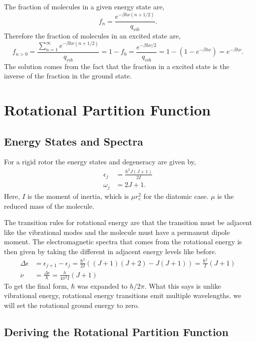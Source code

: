The fraction of molecules in a given energy state are,
\begin{equation*}
	f_n = \frac{e^{-\beta h\nu (n+1/2)}}{q_{vib}}.
\end{equation*}
Therefore the fraction of molecules in an excited state are,
\begin{equation*}
	f_{n > 0} = \frac{\sum_{n=1}^{\infty}{e^{-\beta h\nu (n+1/2)}}}{q_{vib}} = 1
	- f_0 = \frac{e^{-\beta h\nu /2}}{q_{vib}} = 1 - (1 - e^{-\beta h \nu}) =
	e^{-\beta h \nu}.
\end{equation*}
The solution comes from the fact that the fraction in a excited state is the
inverse of the fraction in the ground state.

\section{Rotational Partition Function}%
\subsection{Energy States and Spectra}
\label{sec:rot}
For a rigid rotor the energy states and degeneracy are given by,
\begin{align*}
	\epsilon_j &= \frac{\hbar^2 J(J+1)}{2 I}\\
	\omega_j &= 2J+1.
\end{align*}
Here, $I$ is the moment of inertia, which is $\mu r_e^2 $ for the diatomic
case. $\mu$ is the reduced mass of the molecule. 

The transition rules for rotational energy are that the transition must be
adjacent like the vibrational modes and the molecule must have a permanent
dipole moment. The electromagnetic spectra that comes from the rotational energy
is then given by taking the different in adjacent energy levels like before.
\begin{align*}
	\Delta\epsilon &= \epsilon_{j+1} - \epsilon_j = \frac{\hbar^2}{2I} ((J+1)(J+2)
	- J(J+1)) = \frac{\hbar^2}{I} (J+1)\\
	\nu &= \frac{\Delta\epsilon}{h} = \frac{h}{4\pi^2 I}(J+1)
\end{align*}
To get the final form, $\hbar$ was expanded to $h/2\pi$. What this says is
unlike vibrational energy, rotational energy transitions emit multiple
wavelengths. \note we will set the rotational ground energy to zero.

\subsection{Deriving the Rotational Partition Function}
